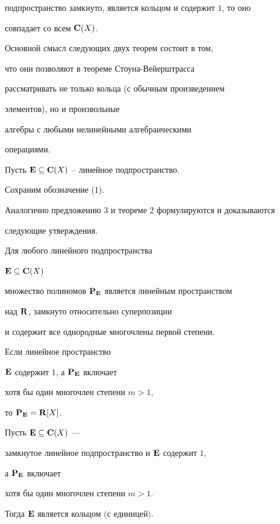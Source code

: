 подпространство замкнуто, является кольцом и содержит $1$, то оно


совпадает со всем ${\bold C}(X)$.





Основной смысл следующих двух теорем состоит в том,


что они позволяют в теореме Стоуна-Вейерштрасса


рассматривать не только кольца (с обычным произведением


элементов), но и произвольные


алгебры с любыми нелинейными алгебраическими


операциями.





Пусть ${\bold E} \subseteq {\bold C}(X)$ -- линейное подпространство.


Сохраним обозначение (1).


Аналогично предложению 3 и теореме 2 формулируются и доказываются


следующие утверждения.





\begin{prop} Для любого линейного подпространства


${\bold E} \subseteq {\bold C}(X)$


множество полиномов $\bold P_{\bold E}$ является линейным пространством


над ${\bold R}$, замкнуто относительно суперпозиции


и содержит все однородные многочлены первой степени.


Если линейное пространство


${\bold E}$ содержит $1$, а $\bold P_{\bold E}$ включает


хотя бы один многочлен степени $m>1$,


то $\bold P_{\bold E}={\bold R}[X]$.


\end{prop}





\begin{thm} Пусть ${\bold E} \subseteq {\bold C}(X)$ ---


замкнутое линейное подпространство и ${\bold E}$ содержит $1$,


а $\bold P_{\bold E}$ включает


хотя бы один многочлен степени $m>1$.


Тогда ${\bold E}$ является кольцом $($с единицей$)$.


\end{thm}






